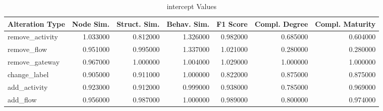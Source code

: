 \begin{table}
\caption{intercept Values}
\label{tab:intercept}
\begin{tabular}{lrrrrrr}
\toprule
Alteration Type & Node Sim. & Struct. Sim. & Behav. Sim. & F1 Score & Compl. Degree & Compl. Maturity \\
\midrule
remove_activity & 1.033000 & 0.812000 & 1.326000 & 0.982000 & 0.685000 & 0.604000 \\
remove_flow & 0.951000 & 0.995000 & 1.337000 & 1.021000 & 0.280000 & 0.280000 \\
remove_gateway & 0.967000 & 1.000000 & 1.004000 & 1.029000 & 1.000000 & 1.000000 \\
change_label & 0.905000 & 0.911000 & 1.000000 & 0.822000 & 0.875000 & 0.875000 \\
add_activity & 0.923000 & 0.912000 & 0.999000 & 0.938000 & 0.785000 & 0.969000 \\
add_flow & 0.956000 & 0.987000 & 1.000000 & 0.989000 & 0.800000 & 0.974000 \\
\bottomrule
\end{tabular}
\end{table}
